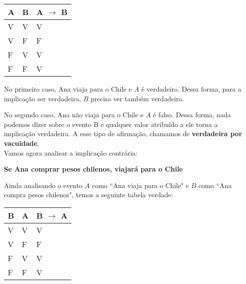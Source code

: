 \begin{table}[htb]
\centering
\begin{tabular}{|l|l|l|}
\hline

\textbf{A} & \textbf{B} & \textbf{A $\to$ B} \\ \hline
V          & V          & V                  \\ \hline
V          & F          & F                  \\ \hline
F          & V          & V                  \\ \hline
F          & F          & V                  \\ \hline

\end{tabular}
\end{table}

No primeiro caso, Ana viaja para o Chile e $A$ é verdadeiro. Dessa forma, para a implicação ser verdadeira, $B$ precisa ver também verdadeiro.

No segundo caso, Ana não viaja para o Chile e $A$ é falso.
Dessa forma, nada podemos dizer sobre o evento B e qualquer valor atribuído a ele torna a implicação verdadeira. A esse tipo de afirmação, chamamos de \textbf{verdadeira por vacuidade}.\\

Vamos agora analisar a implicação contrária:
\begin{center}

\textbf{Se Ana comprar pesos chilenos, viajará para o Chile}

\end{center}
Ainda analisando o evento $A$ como ``Ana viaja para o Chile" e $B$ como ``Ana compra pesos chilenos", temos a seguinte tabela verdade:

\begin{table}[htb]
\centering
\begin{tabular}{|l|l|l|}
\hline

\textbf{B} & \textbf{A} & \textbf{B $\to$ A} \\ \hline
V          & V          & V                  \\ \hline
V          & F          & F                  \\ \hline
F          & V          & V                  \\ \hline
F          & F          & V                  \\ \hline

\end{tabular}
\end{table}

